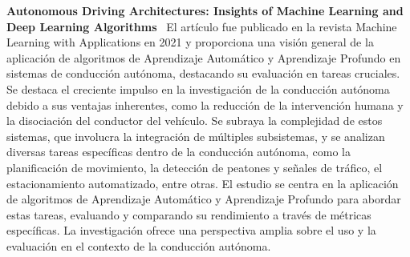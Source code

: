 
\setcounter{secnumdepth}{0}

\noindent\textbf{Autonomous Driving Architectures: Insights of Machine Learning and Deep Learning Algorithms}~\cite{bachute2021autonomous}
El artículo fue publicado en la revista Machine Learning with Applications en 2021 y
proporciona una visión general de la aplicación de algoritmos de Aprendizaje Automático y Aprendizaje Profundo
en sistemas de conducción autónoma, destacando su evaluación en tareas cruciales.
Se destaca el creciente impulso en la investigación de la conducción autónoma debido a sus ventajas inherentes, como la reducción
de la intervención humana y la disociación del conductor del vehículo.
Se subraya la complejidad de estos sistemas,
que involucra la integración de múltiples subsistemas, y se analizan diversas tareas específicas dentro de la conducción autónoma,
como la planificación de movimiento, la detección de peatones y señales de tráfico, el estacionamiento automatizado, entre otras.
El estudio se centra en la aplicación de algoritmos de Aprendizaje Automático y Aprendizaje Profundo para abordar estas tareas,
evaluando y comparando su rendimiento a través de métricas específicas. La investigación ofrece una perspectiva amplia sobre el uso
y la evaluación en el contexto de la conducción autónoma.
